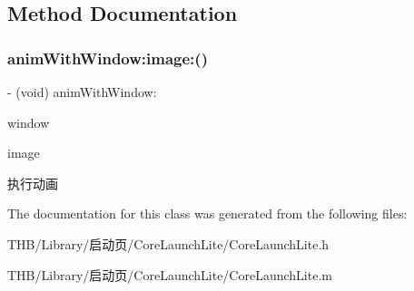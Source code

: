 \subsection{Method Documentation}
\mbox{\label{interface_core_launch_lite_a65dc8c897d74afd1999778a2c910d3ef}} 
\subsubsection{\texorpdfstring{anim\+With\+Window\+:image\+:()}{animWithWindow:image:()}}
{\footnotesize\ttfamily -\/ (void) anim\+With\+Window\+: \begin{DoxyParamCaption}\item[{(U\+I\+Window $\ast$)}]{window }\item[{image:(U\+I\+Image $\ast$)}]{image }\end{DoxyParamCaption}}

执行动画 

The documentation for this class was generated from the following files\+:\begin{DoxyCompactItemize}
\item 
T\+H\+B/\+Library/启动页/\+Core\+Launch\+Lite/Core\+Launch\+Lite.\+h\item 
T\+H\+B/\+Library/启动页/\+Core\+Launch\+Lite/Core\+Launch\+Lite.\+m\end{DoxyCompactItemize}
